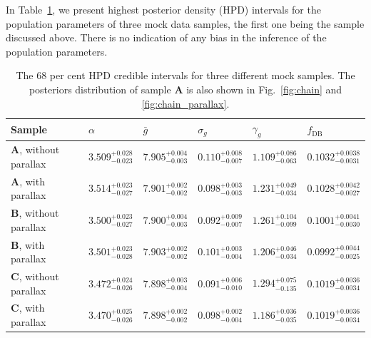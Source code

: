 \documentclass[fleqn,usenatbib]{mnras}
\begin{document}
In Table~\ref{tab:posteriors}, we present highest posterior density (HPD) intervals for the population parameters of three mock data samples, the first one being the sample discussed above. There is no indication of any bias in the inference of the population parameters.

\begin{table}
	\centering
	\caption{The 68 per cent HPD credible intervals for three different mock samples. The posteriors distribution of sample \textbf{A} is also shown in Fig.~\ref{fig:chain} and \ref{fig:chain_parallax}.}
	\label{tab:posteriors}
    \begin{tabular}{l l l l l l}
		\hline
		Sample  & $\alpha$ & $\bar{g}$ & $\sigma_g$ & $\gamma_g$ & $f_\text{DB}$  \\
		\hline
		\textbf{A}, without parallax &
			$3.509^{+0.028}_{-0.023}$ & 
			$7.905^{+0.004}_{-0.003}$ & 
			$0.110^{+0.008}_{-0.007}$ & 
			$1.109^{+0.086}_{-0.063}$ & 
			$0.1032^{+0.0038}_{-0.0031}$ \vspace{2pt} \\
		\textbf{A}, with parallax &
			$3.514^{+0.023}_{-0.027}$ &
			$7.901^{+0.002}_{-0.002}$ & 
			$0.098^{+0.003}_{-0.003}$ &
			$1.231^{+0.049}_{-0.034}$ &
			$0.1028^{+0.0042}_{-0.0027}$ \\
		\hline
		\textbf{B}, without parallax &
			$3.500^{+0.023}_{-0.027}$ & 
			$7.900^{+0.004}_{-0.003}$ & 
			$0.092^{+0.009}_{-0.007}$ & 
			$1.261^{+0.104}_{-0.099}$ & 
			$0.1001^{+0.0041}_{-0.0030}$ \vspace{2pt} \\
		\textbf{B}, with parallax &
			$3.501^{+0.023}_{-0.028}$ & 
			$7.903^{+0.002}_{-0.002}$ & 
			$0.101^{+0.003}_{-0.004}$ & 
			$1.206^{+0.046}_{-0.034}$ & 
			$0.0992^{+0.0044}_{-0.0025}$ \\
		\hline
			\textbf{C}, without parallax &
			$3.472^{+0.024}_{-0.026}$ & 
			$7.898^{+0.003}_{-0.004}$ & 
			$0.091^{+0.006}_{-0.010}$ & 
			$1.294^{+0.075}_{-0.135}$ & 
			$0.1019^{+0.0036}_{-0.0034}$ \vspace{2pt} \\
		\textbf{C}, with parallax &
			$3.470^{+0.025}_{-0.026}$ & 
			$7.898^{+0.002}_{-0.002}$ & 
			$0.098^{+0.002}_{-0.004}$ & 
			$1.186^{+0.036}_{-0.035}$ & 
			$0.1019^{+0.0036}_{-0.0034}$ \\
		\hline
	\end{tabular}
\end{table}
\end{document}
